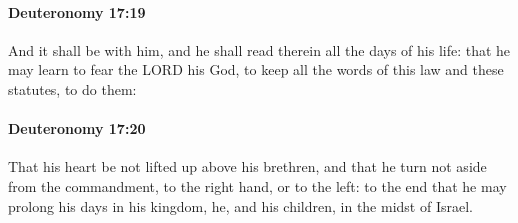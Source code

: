 		\paragraph{Deuteronomy 17:19} %
			\label{DEUTERONOMY-17-19}

			And it shall be with him, and he shall read therein all the days of his life: that he may learn to fear the LORD his God, to keep all the words of this law and these statutes, to do them:


		\paragraph{Deuteronomy 17:20} %
			\label{DEUTERONOMY-17-20}

			That his heart be not lifted up above his brethren, and that he turn not aside from the commandment, to the right hand, or to the left: to the end that he may prolong his days in his kingdom, he, and his children, in the midst of Israel.

